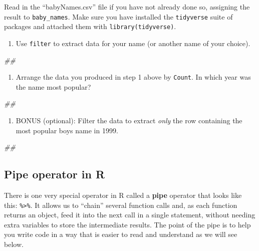 \documentclass[]{book}
\newenvironment{Shaded}{\begin{snugshade}}{\end{snugshade}}
\newcommand{\CommentTok}[1]{\textcolor[rgb]{0.56,0.35,0.01}{\textit{#1}}}
\providecommand{\tightlist}{%
  \setlength{\itemsep}{0pt}\setlength{\parskip}{0pt}}
\begin{document}
Read in the ``babyNames.csv'' file if you have not already done so,
assigning the result to \texttt{baby\_names}. Make sure you have installed
the \texttt{tidyverse} suite of packages and attached them with \texttt{library(tidyverse)}.

\begin{enumerate}
\def\labelenumi{\arabic{enumi}.}
\tightlist
\item
  Use \texttt{filter} to extract data for your name (or another name of your choice).
\end{enumerate}

\begin{Shaded}
\begin{Highlighting}[]
\CommentTok{##}
\end{Highlighting}
\end{Shaded}

\begin{enumerate}
\def\labelenumi{\arabic{enumi}.}
\setcounter{enumi}{1}
\tightlist
\item
  Arrange the data you produced in step 1 above by \texttt{Count}.
  In which year was the name most popular?
\end{enumerate}

\begin{Shaded}
\begin{Highlighting}[]
\CommentTok{##}
\end{Highlighting}
\end{Shaded}

\begin{enumerate}
\def\labelenumi{\arabic{enumi}.}
\setcounter{enumi}{2}
\tightlist
\item
  BONUS (optional): Filter the data to extract \emph{only} the
  row containing the most popular boys name in 1999.
\end{enumerate}

\begin{Shaded}
\begin{Highlighting}[]
\CommentTok{##}
\end{Highlighting}
\end{Shaded}

\hypertarget{pipe-operator-in-r}{%
\subsection{Pipe operator in R}\label{pipe-operator-in-r}}

There is one very special operator in R called a \textbf{pipe} operator that
looks like this: \texttt{\%\textgreater{}\%}. It allows us to ``chain'' several function calls and,
as each function returns an object, feed it into the next call in a single
statement, without needing extra variables to store the intermediate
results. The point of the pipe is to help you write code in a way that is
easier to read and understand as we will see below.
\end{document}
